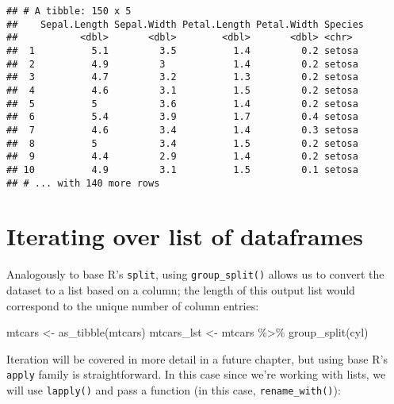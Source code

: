\documentclass[
]{book}
\newenvironment{Shaded}{\begin{snugshade}}{\end{snugshade}}
\newcommand{\AttributeTok}[1]{\textcolor[rgb]{0.77,0.63,0.00}{#1}}
\newcommand{\ControlFlowTok}[1]{\textcolor[rgb]{0.13,0.29,0.53}{\textbf{#1}}}
\newcommand{\DecValTok}[1]{\textcolor[rgb]{0.00,0.00,0.81}{#1}}
\newcommand{\FunctionTok}[1]{\textcolor[rgb]{0.00,0.00,0.00}{#1}}
\newcommand{\NormalTok}[1]{#1}
\newcommand{\OtherTok}[1]{\textcolor[rgb]{0.56,0.35,0.01}{#1}}
\newcommand{\SpecialCharTok}[1]{\textcolor[rgb]{0.00,0.00,0.00}{#1}}
\newcommand{\StringTok}[1]{\textcolor[rgb]{0.31,0.60,0.02}{#1}}
\begin{document}
\begin{verbatim}
## # A tibble: 150 x 5
##    Sepal.Length Sepal.Width Petal.Length Petal.Width Species
##           <dbl>       <dbl>        <dbl>       <dbl> <chr>  
##  1          5.1         3.5          1.4         0.2 setosa 
##  2          4.9         3            1.4         0.2 setosa 
##  3          4.7         3.2          1.3         0.2 setosa 
##  4          4.6         3.1          1.5         0.2 setosa 
##  5          5           3.6          1.4         0.2 setosa 
##  6          5.4         3.9          1.7         0.4 setosa 
##  7          4.6         3.4          1.4         0.3 setosa 
##  8          5           3.4          1.5         0.2 setosa 
##  9          4.4         2.9          1.4         0.2 setosa 
## 10          4.9         3.1          1.5         0.1 setosa 
## # ... with 140 more rows
\end{verbatim}

\hypertarget{iterating-over-list-of-dataframes}{%
\section{Iterating over list of dataframes}\label{iterating-over-list-of-dataframes}}

Analogously to base R's \texttt{split}, using \texttt{group\_split()} allows us to convert the dataset to a list based on a column; the length of this output list would correspond to the unique number of column entries:

\begin{Shaded}
\begin{Highlighting}[]
\NormalTok{mtcars }\OtherTok{\textless{}{-}} \FunctionTok{as\_tibble}\NormalTok{(mtcars)}
\NormalTok{mtcars\_lst }\OtherTok{\textless{}{-}}\NormalTok{ mtcars }\SpecialCharTok{\%\textgreater{}\%} \FunctionTok{group\_split}\NormalTok{(cyl)}
\end{Highlighting}
\end{Shaded}

Iteration will be covered in more detail in a future chapter, but using base R's \texttt{apply} family is straightforward. In this case since we're working with lists, we will use \texttt{lapply()} and pass a function (in this case, \texttt{rename\_with()}):

\begin{Shaded}
\end{Shaded}
\end{document}
